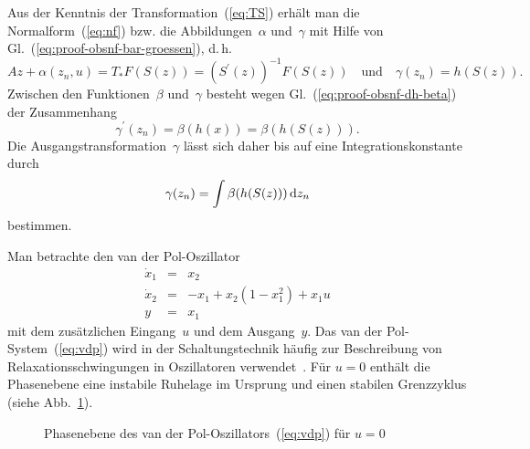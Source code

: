 Aus der Kenntnis der Transformation~(\ref{eq:TS}) erhält man die
Normalform~(\ref{eq:nf}) bzw. die Abbildungen~$\alpha$ und~$\gamma$
mit Hilfe von Gl.~(\ref{eq:proof-obsnf-bar-groessen}), d.\,h. 
\[
Az+\alpha(z_{n},u)=T_{*}F(S(z))=\left(S^{\prime}(z)\right)^{-1}F(S(z))\quad\mbox{und}\quad\gamma(z_{n})=h(S(z)).
\]
Zwischen den Funktionen~$\beta$ und~$\gamma$ besteht wegen Gl.~(\ref{eq:proof-obsnf-dh-beta})
der Zusammenhang 
\begin{equation}
\gamma^{\prime}(z_{n})=\beta(h(x))=\beta(h(S(z))).\label{eq:dgamma-beta}
\end{equation}
Die Ausgangstransformation~$\gamma$ lässt sich daher bis auf eine
Integrationskonstante durch 
\[
\gamma(z_{n})=\int\beta(h(S(z)))\,{\mathrm{d}} z_{n}
\]
bestimmen.

\begin{example}
\label{exa:van-der-Pol-Krener-Isidori}Man betrachte den van der Pol-Oszillator
\begin{equation}
\begin{array}{lcl}
\dot{x}_{1} & = & x_{2}\\
\dot{x}_{2} & = & -x_{1}+x_{2}(1-x_{1}^{2})+x_{1}u\\
y & = & x_{1}
\end{array}\label{eq:vdp}
\end{equation}
mit dem zusätzlichen Eingang~$u$ und dem Ausgang~$y$. Das van
der Pol-System~(\ref{eq:vdp}) wird in der Schaltungstechnik häufig
zur Beschreibung von Relaxationsschwingungen in Oszillatoren verwendet~\cite{van-der-pol1926,guckenheimer83,prochaska2004}.
Für $u=0$ enthält die Phasenebene eine instabile Ruhelage im Ursprung
und einen stabilen Grenzzyklus (siehe Abb.~\ref{fig:Phasenportrait-vdP}).
\end{example}
\begin{figure}
\begin{centering}
\resizebox{0.85\textwidth}{!}{}
\par\end{centering}
\caption{Phasenebene des van der Pol-Oszillators~(\ref{eq:vdp}) für $u=0$\label{fig:Phasenportrait-vdP}}
\end{figure}

